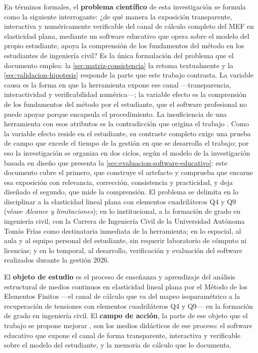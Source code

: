En términos formales, el \textbf{problema científico} de esta investigación se formula como la siguiente interrogante: ¿de qué manera la exposición transparente, interactiva y numéricamente verificable del canal de cálculo completo del MEF en elasticidad plana, mediante un software educativo que opera sobre el modelo del propio estudiante, apoya la comprensión de los fundamentos del método en los estudiantes de ingeniería civil? Es la única formulación del problema que el documento emplea: la \autoref{sec:matriz-consistencia} la retoma textualmente y la \autoref{sec:validacion-hipotesis} responde la parte que este trabajo contrasta. La variable causa es la forma en que la herramienta expone ese canal —transparencia, interactividad y verificabilidad numérica—; la variable efecto es la comprensión de los fundamentos del método por el estudiante, que el software profesional no puede apoyar porque encapsula el procedimiento. La insuficiencia de una herramienta con esos atributos es la contradicción que origina el trabajo \autocite[p.~7]{alvarez_metodologia}. Como la variable efecto reside en el estudiante, su contraste completo exige una prueba de campo que excede el tiempo de la gestión en que se desarrolla el trabajo; por eso la investigación se organiza en dos ciclos, según el modelo de la investigación basada en diseño que presenta la \autoref{sec:evaluacion-software-educativo}: este documento cubre el primero, que construye el artefacto y comprueba que encarne esa exposición con relevancia, corrección, consistencia y practicidad, y deja diseñado el segundo, que mide la comprensión. El problema se delimita en lo disciplinar a la elasticidad lineal plana con elementos cuadriláteros Q4 y Q9 (véase \emph{Alcance y limitaciones}); en lo institucional, a la formación de grado en ingeniería civil, con la Carrera de Ingeniería Civil de la Universidad Autónoma Tomás Frías como destinataria inmediata de la herramienta; en lo espacial, al aula y al equipo personal del estudiante, sin requerir laboratorio de cómputo ni licencias; y en lo temporal, al desarrollo, verificación y evaluación del software realizados durante la gestión 2026.

El \textbf{objeto de estudio} \autocite[p.~8]{alvarez_metodologia} es el proceso de enseñanza y aprendizaje del análisis estructural de medios continuos en elasticidad lineal plana por el Método de los Elementos Finitos —el canal de cálculo que va del mapeo isoparamétrico a la recuperación de tensiones con elementos cuadriláteros Q4 y Q9— en la formación de grado en ingeniería civil. El \textbf{campo de acción}, la parte de ese objeto que el trabajo se propone mejorar \autocite[p.~13]{alvarez_metodologia}, son los medios didácticos de ese proceso: el software educativo que expone el canal de forma transparente, interactiva y verificable sobre el modelo del estudiante, y la memoria de cálculo que lo documenta.

